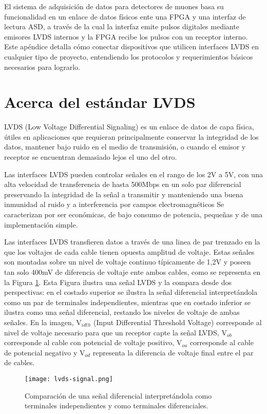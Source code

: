 El sistema de adquisición de datos para detectores de muones basa su funcionalidad en un enlace de datos físicos ente una FPGA y una interfaz de lectura ASD, a través de la cual la interfaz emite pulsos digitales mediante emisores LVDS internos y  la FPGA recibe los pulsos con un receptor interno. Este apéndice detalla cómo conectar dispositivos que utilicen interfaces LVDS en cualquier tipo de proyecto, entendiendo los protocolos y requerimientos básicos necesarios para lograrlo.

\section{Acerca del estándar LVDS}	
	LVDS (Low Voltage Differential Signaling) \cite{1996IEEESociety} es un enlace de datos de capa física, útiles en aplicaciones que requieran principalmente conservar la integridad de los datos, mantener bajo ruido en el medio de transmisión, o cuando el emisor y receptor se encuentran demasiado lejos el uno del otro.
	
	Las interfaces LVDS pueden controlar señales en el rango de los 2V a 5V, con una alta velocidad de transferencia de hasta 500Mbps en un solo par diferencial preservando la integridad de la señal a transmitir y manteniendo una buena inmunidad al ruido y a interferencia por campos electromagnéticos Se caracterizan por ser económicas, de bajo consumo de potencia, pequeñas y de una implementación simple.

	Las interfaces LVDS transfieren datos a través de una linea de par trenzado en la que los voltajes de cada cable tienen opuesta amplitud de voltaje. Estas señales son montadas sobre un nivel de voltaje continuo típicamente de 1,2V y poseen tan solo 400mV de diferencia de voltaje ente ambos cables, como se representa en la Figura \ref{fig:lvds-signal}. Esta Figura ilustra una señal LVDS y la compara desde dos perspectivas: en el costado superior se ilustra la señal diferencial interpretándola como un par de terminales independientes, mientras que en costado inferior se ilustra como una señal diferencial, restando los niveles de voltaje de ambas señales. En la imagen, V$_{idth}$ (Input Differential Threshold Voltage) corresponde al nivel de voltaje necesario para que un receptor capte la señal LVDS,  V$_{ob}$ corresponde al cable con potencial de voltaje positivo,  V$_{oa}$ corresponde al cable de potencial negativo y  V$_{od}$ representa la diferencia de voltaje final entre el par de cables.
	
	\begin{figure}[ht]
		\centering
		\texttt{[image: lvds-signal.png]}
		\caption{Comparación de una señal diferencial interpretándola como terminales independientes y como terminales diferenciales.}
		\label{fig:lvds-signal}
	\end{figure}
	
